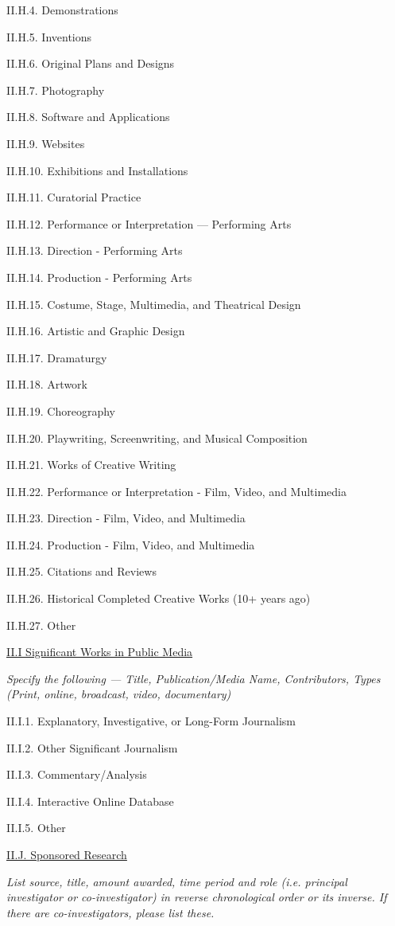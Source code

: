 \documentclass[11pt,letterpaper]{article}
\begin{document}
II.H.4. Demonstrations

II.H.5. Inventions

II.H.6. Original Plans and Designs

II.H.7. Photography

II.H.8. Software and Applications

II.H.9. Websites

II.H.10. Exhibitions and Installations

II.H.11. Curatorial Practice

II.H.12. Performance or Interpretation --- Performing Arts

II.H.13. Direction - Performing Arts

II.H.14. Production - Performing Arts

II.H.15. Costume, Stage, Multimedia, and Theatrical Design

II.H.16. Artistic and Graphic Design

II.H.17. Dramaturgy

II.H.18. Artwork

II.H.19. Choreography

II.H.20. Playwriting, Screenwriting, and Musical Composition

II.H.21. Works of Creative Writing

II.H.22. Performance or Interpretation - Film, Video, and Multimedia

II.H.23. Direction - Film, Video, and Multimedia

II.H.24. Production - Film, Video, and Multimedia

II.H.25. Citations and Reviews

II.H.26. Historical Completed Creative Works (10+ years ago)

II.H.27. Other


\underline{II.I Significant Works in Public Media}

\textit{Specify the following --- Title, Publication/Media Name, Contributors, Types (Print, online, broadcast, video, documentary)}

II.I.1. Explanatory, Investigative, or Long-Form Journalism

II.I.2. Other Significant Journalism

II.I.3. Commentary/Analysis

II.I.4. Interactive Online Database

II.I.5. Other


\underline{II.J. Sponsored Research}

\textit{List source, title, amount awarded, time period and role (i.e. principal investigator or co-investigator) in reverse chronological order or its inverse.  If there are co-investigators, please list these.}
\end{document}
